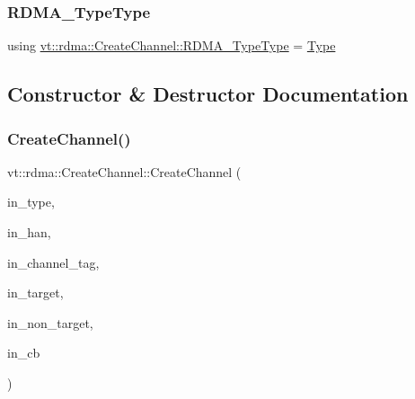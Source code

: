 \subsubsection{\texorpdfstring{R\+D\+M\+A\+\_\+\+Type\+Type}{RDMA\_TypeType}}
{\footnotesize\ttfamily using \hyperlink{namespacevt_1_1rdma_ac848e1d9da43db6294bd06f83e5d3946}{vt\+::rdma\+::\+Create\+Channel\+::\+R\+D\+M\+A\+\_\+\+Type\+Type} =  \hyperlink{namespacevt_1_1rdma_ac848e1d9da43db6294bd06f83e5d3946}{Type}}



\subsection{Constructor \& Destructor Documentation}
\mbox{\label{structvt_1_1rdma_1_1_create_channel_ad3c3265c63c536dfb68e30886438bdf8}} 
\subsubsection{\texorpdfstring{Create\+Channel()}{CreateChannel()}}
{\footnotesize\ttfamily vt\+::rdma\+::\+Create\+Channel\+::\+Create\+Channel (\begin{DoxyParamCaption}\item[{\hyperlink{namespacevt_1_1rdma_ac848e1d9da43db6294bd06f83e5d3946}{R\+D\+M\+A\+\_\+\+Type\+Type} const \&}]{in\+\_\+type,  }\item[{\hyperlink{namespacevt_a10442579ec4e7ebef223818e64bcf908}{R\+D\+M\+A\+\_\+\+Handle\+Type} const \&}]{in\+\_\+han,  }\item[{\hyperlink{namespacevt_a84ab281dae04a52a4b243d6bf62d0e52}{Tag\+Type} const \&}]{in\+\_\+channel\+\_\+tag,  }\item[{\hyperlink{namespacevt_a866da9d0efc19c0a1ce79e9e492f47e2}{Node\+Type} const \&}]{in\+\_\+target,  }\item[{\hyperlink{namespacevt_a866da9d0efc19c0a1ce79e9e492f47e2}{Node\+Type} const \&}]{in\+\_\+non\+\_\+target,  }\item[{\hyperlink{namespacevt_a36db99df4c973d48b1118a293fff533f}{Callback}$<$ \hyperlink{structvt_1_1rdma_1_1_get_info_channel}{Get\+Info\+Channel} $>$}]{in\+\_\+cb }\end{DoxyParamCaption})\hspace{0.3cm}{\ttfamily [inline]}}



